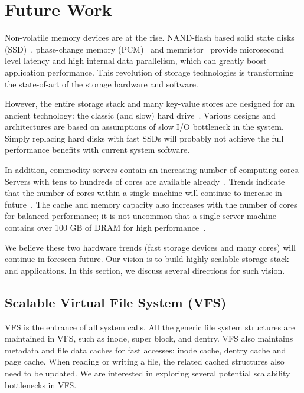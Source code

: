 \section{Future Work}
\label{sec-conc-future}

Non-volatile memory devices are at the rise.  NAND-flash based solid state disks
(SSD)~\cite{Caulfield+09-Gordon,Grupp+09-FlashMeasure}, phase-change
memory (PCM)~\cite{Caulfield+10-Moneta,Condit+09-BPFS} and
memristor~\cite{Strukov08-memristor} provide microsecond level latency
and high internal data parallelism, which can greatly boost
application performance.  This revolution of storage technologies is 
transforming the state-of-art of the storage hardware and software.  

However, the entire storage stack and many key-value stores are
designed for an ancient technology: the classic (and slow) hard
drive~\cite{CardEtAl94-Ext2,Iyer01-Anticipatory,Kleiman86-Vnodes,McKusickEtAl-FFS-84,  
Seltzer90-SchedRevisit,WorthingtonEtAl94-Scheduling}.
Various designs and architectures are based on assumptions of slow I/O
bottleneck in the system.  Simply replacing hard disks with fast SSDs
will probably not achieve the full performance benefits with current
system software.  

In addition, commodity servers contain an increasing number of computing cores.   
Servers with tens to hundreds of cores are available already~\cite{seamicro}.
Trends indicate that the number of cores within a single machine will
continue to increase in future~\cite{Borkar07-ThousandCore}.  The
cache and memory capacity also increases with the number of cores for
balanced performance; it is not uncommon that a single server machine
contains over 100 GB of DRAM for high performance~\cite{Clements+13-Commute,David+13-Sync}. 

We believe these two hardware trends (fast storage devices and many
cores) will continue in foreseen future.  Our vision is to build
highly scalable storage stack and applications.  In this section, we
discuss several directions for such vision. 

\subsection{Scalable Virtual File System (VFS)}

VFS is the entrance of all system calls.  All the generic file system 
structures are maintained in VFS, such as inode, super block, and dentry.
VFS also maintains metadata and file data caches for fast accesses:
inode cache, dentry cache and page cache.  When reading or writing a file,
the related cached structures also need to be updated.  
We are interested in exploring several potential scalability
bottlenecks in VFS. 

